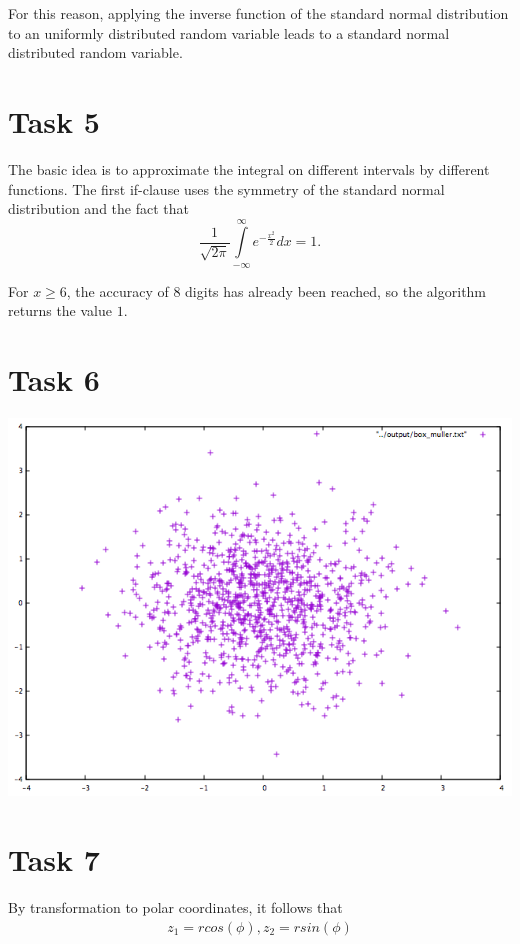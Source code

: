 \documentclass[10pt,a4paper]{article}
\begin{document}
For this reason, applying the inverse function of the standard normal distribution to an uniformly distributed random variable leads to a standard normal distributed random variable.  

\newpage

\section*{Task 5}

The basic idea is to approximate the integral on different intervals by different functions. The first if-clause uses the symmetry of the standard normal distribution and the fact that 
\[
	\frac{1}{\sqrt{2 \pi}}\int\limits_{-\infty}^{\infty}e^{-\frac{x^2}{2}}dx=1.
\]

For $x\geq 6$, the accuracy of $8$ digits has already been reached, so the algorithm returns the value $1$.

\section*{Task 6}

\begin{center}
\includegraphics[scale=0.4]{box_mueller.jpeg}
\end{center}

\section*{Task 7}

By transformation to polar coordinates, it follows that
\begin{align*}
	z_1=r cos(\phi), z_2=r sin(\phi)
\end{align*}   
\end{document}
